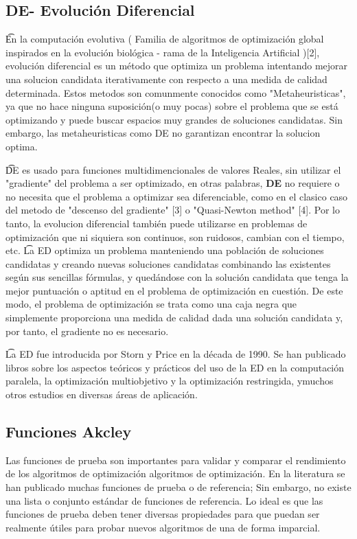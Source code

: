\documentclass[10pt]{article}
\begin{document}
\subsection{\textbf{DE}- Evolución Diferencial }
\t En la computación evolutiva (  Familia de algoritmos de optimización global inspirados en la evolución biológica - rama de la Inteligencia Artificial )[2], evolución diferencial es un método que optimiza un problema intentando mejorar una solucion candidata iterativamente con respecto a una medida de calidad determinada. Estos metodos son comunmente conocidos como "Metaheuristicas", ya que no hace ninguna suposición(o muy pocas)  sobre el problema que se está optimizando y puede buscar espacios muy grandes de soluciones candidatas. Sin embargo, las metaheuristicas como DE no garantizan encontrar la solucion optima.

\t  DE es usado para funciones multidimencionales de valores Reales, sin utilizar el "gradiente" del problema a ser optimizado, en otras palabras, \textbf{DE} no requiere o no necesita que el problema a optimizar sea diferenciable, como en el clasico caso del metodo de "descenso del gradiente" [3] o "Quasi-Newton method" [4]. Por lo tanto, la evolucion diferencial también puede utilizarse en problemas de optimización que ni siquiera son continuos, son ruidosos, cambian con el tiempo, etc.
\t La ED optimiza un problema manteniendo una población de soluciones candidatas y creando nuevas soluciones candidatas combinando las existentes según sus sencillas fórmulas, y quedándose con la solución candidata que tenga la mejor puntuación o aptitud en el problema de optimización en cuestión. De este modo, el problema de optimización se trata como una caja negra que simplemente proporciona una medida de calidad dada una solución candidata y, por tanto, el gradiente no es necesario.

\t La ED fue introducida por Storn y Price en la década de 1990. Se han publicado libros sobre los aspectos teóricos y prácticos del uso de la ED en la computación paralela, la optimización multiobjetivo y la optimización restringida, ymuchos otros estudios en diversas áreas de aplicación. 

\subsection{Funciones Akcley}

Las funciones de prueba son importantes para validar y comparar el rendimiento de los algoritmos de optimización algoritmos de optimización. En la literatura se han publicado muchas funciones de prueba o de referencia; Sin embargo, no existe una lista o conjunto estándar de funciones de referencia. Lo ideal es que las funciones de prueba deben tener diversas propiedades para que puedan ser realmente útiles para probar nuevos algoritmos de una
de forma imparcial.
\end{document}
